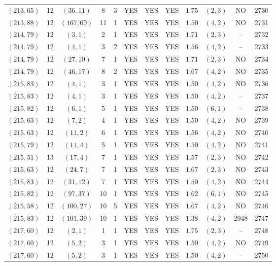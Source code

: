 \begin{longtable}{|c|c|c|c|c|c|c|c|c|c|c|c|}
$(213,65)$ & 12 & $(36,11)$ & 8 & 3 & YES & YES & YES & $1.75$ & $(2,3)$ & NO & 2730\\
$(213,88)$ & 12 & $(167,69)$ & 11 & 1 & YES & YES & YES & $1.50$ & $(4,2)$ & NO & 2731\\
$(214,79)$ & 12 & $(3,1)$ & 2 & 1 & YES & YES & YES & $1.71$ & $(2,3)$ & -- & 2732\\
$(214,79)$ & 12 & $(4,1)$ & 3 & 2 & YES & YES & YES & $1.56$ & $(4,2)$ & -- & 2733\\
$(214,79)$ & 12 & $(27,10)$ & 7 & 1 & YES & YES & YES & $1.71$ & $(2,3)$ & NO & 2734\\
$(214,79)$ & 12 & $(46,17)$ & 8 & 2 & YES & YES & YES & $1.67$ & $(4,2)$ & NO & 2735\\
$(215,83)$ & 12 & $(4,1)$ & 3 & 1 & YES & YES & YES & $1.50$ & $(4,2)$ & NO & 2736\\
$(215,83)$ & 12 & $(4,1)$ & 3 & 1 & YES & YES & YES & $1.50$ & $(4,2)$ & -- & 2737\\
$(215,82)$ & 12 & $(6,1)$ & 5 & 1 & YES & YES & YES & $1.50$ & $(6,1)$ & -- & 2738\\
$(215,63)$ & 12 & $(7,2)$ & 4 & 1 & YES & YES & YES & $1.50$ & $(4,2)$ & NO & 2739\\
$(215,63)$ & 12 & $(11,2)$ & 6 & 1 & YES & YES & YES & $1.56$ & $(4,2)$ & NO & 2740\\
$(215,79)$ & 12 & $(11,4)$ & 5 & 1 & YES & YES & YES & $1.50$ & $(4,2)$ & NO & 2741\\
$(215,51)$ & 13 & $(17,4)$ & 7 & 1 & YES & YES & YES & $1.57$ & $(2,3)$ & NO & 2742\\
$(215,63)$ & 12 & $(24,7)$ & 7 & 1 & YES & YES & YES & $1.67$ & $(2,3)$ & NO & 2743\\
$(215,83)$ & 12 & $(31,12)$ & 7 & 1 & YES & YES & YES & $1.50$ & $(4,2)$ & NO & 2744\\
$(215,82)$ & 12 & $(97,37)$ & 10 & 1 & YES & YES & YES & $1.62$ & $(6,1)$ & NO & 2745\\
$(215,58)$ & 12 & $(100,27)$ & 10 & 5 & YES & YES & YES & $1.67$ & $(4,2)$ & NO & 2746\\
$(215,83)$ & 12 & $(101,39)$ & 10 & 1 & YES & YES & YES & $1.38$ & $(4,2)$ & 2948 & 2747\\
$(217,60)$ & 12 & $(2,1)$ & 1 & 1 & YES & YES & YES & $1.75$ & $(2,3)$ & -- & 2748\\
$(217,60)$ & 12 & $(5,2)$ & 3 & 1 & YES & YES & YES & $1.50$ & $(4,2)$ & NO & 2749\\
$(217,60)$ & 12 & $(5,2)$ & 3 & 1 & YES & YES & YES & $1.50$ & $(4,2)$ & -- & 2750\\

\end{longtable}
